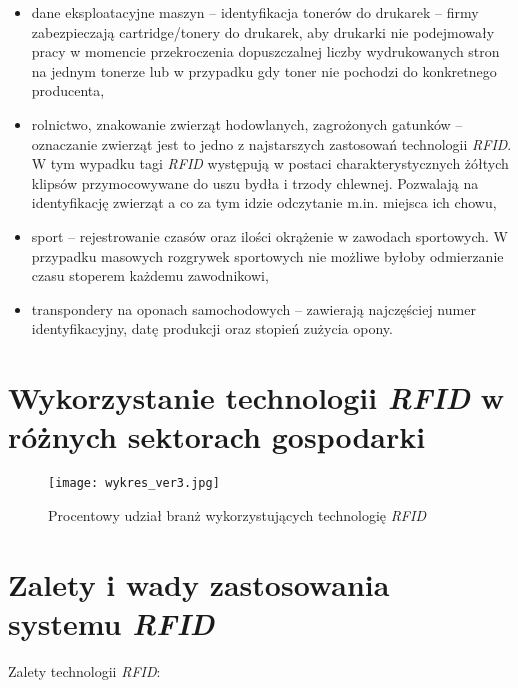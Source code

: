 \begin{itemize}
	\item dane eksploatacyjne maszyn – identyfikacja tonerów do drukarek – firmy zabezpieczają cartridge/tonery do drukarek, aby drukarki nie podejmowały pracy w momencie przekroczenia dopuszczalnej liczby wydrukowanych stron na jednym tonerze lub w przypadku gdy toner nie pochodzi do konkretnego producenta, 
	
	\item rolnictwo, znakowanie zwierząt hodowlanych, zagrożonych gatunków –oznaczanie zwierząt jest to jedno z najstarszych zastosowań technologii \emph{RFID}. W tym wypadku tagi \emph{RFID} występują w postaci charakterystycznych żółtych klipsów przymocowywane do uszu bydła i trzody chlewnej. Pozwalają na identyfikację zwierząt a co za tym idzie odczytanie m.in. miejsca ich chowu,
	
	\item sport – rejestrowanie czasów oraz ilości okrążenie w zawodach sportowych.  W przypadku masowych rozgrywek sportowych  nie możliwe byłoby odmierzanie czasu stoperem każdemu zawodnikowi,
	
	\item transpondery na oponach samochodowych – zawierają najczęściej numer identyfikacyjny, datę produkcji oraz stopień zużycia opony.

\end{itemize}

\newpage
\section{Wykorzystanie technologii \emph{RFID} w różnych sektorach gospodarki}

	\begin{figure}[h!]
	\centering
	    \texttt{[image: wykres\_ver3.jpg]}
	    \caption{Procentowy udział branż wykorzystujących technologię \emph{RFID}}
	\end{figure}


\section {Zalety i wady zastosowania systemu \emph{RFID}}

Zalety technologii \emph{RFID}:

